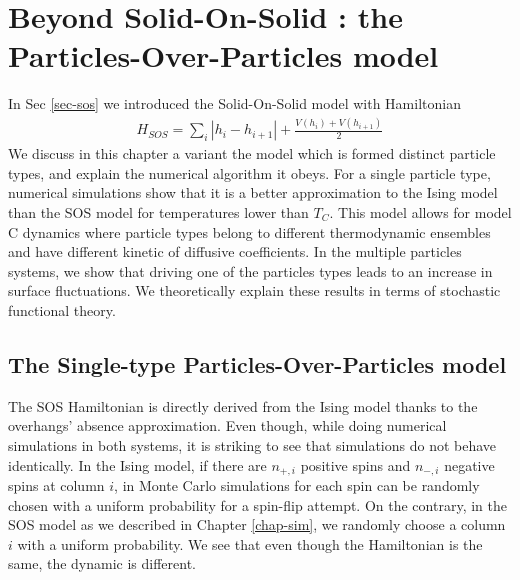 \chapter{Beyond Solid-On-Solid : the Particles-Over-Particles model}
\label{chap-pop}

In Sec \ref{sec-sos} we introduced the Solid-On-Solid model with Hamiltonian
\begin{align}
H_{SOS} = \sum_i |h_i-h_{i+1}| + \frac{V(h_i)+V(h_{i+1})}{2}
\end{align}
We discuss in this chapter a variant the model which is formed distinct particle types, and explain the numerical algorithm it obeys. For a single particle type, numerical simulations show that it is a better approximation to the Ising model than the SOS model for temperatures lower than $T_C$. This model allows for model C dynamics where particle types belong to different thermodynamic ensembles and have different kinetic of diffusive coefficients.
In the multiple particles systems, we show that driving one of the particles types leads to an increase in surface fluctuations. We theoretically explain these results in terms of stochastic functional theory.

\section{The Single-type Particles-Over-Particles model}

The SOS Hamiltonian is directly derived from the Ising model thanks to the overhangs' absence approximation. Even though, while doing numerical simulations in both systems, it is striking to see that simulations do not behave identically. In the Ising model, if there are $n_{+,i}$ positive spins and $n_{-,i}$ negative spins at column $i$, in Monte Carlo simulations for each spin can be randomly chosen with a uniform probability for a spin-flip attempt. On the contrary, in the SOS model as we described in Chapter \ref{chap-sim}, we randomly choose a column $i$ with a uniform probability. We see that even though the Hamiltonian is the same, the dynamic is different.


